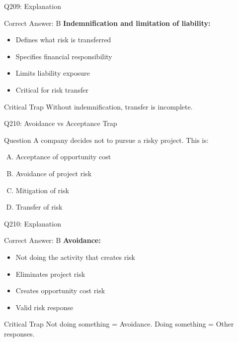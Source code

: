 \documentclass{beamer}
\begin{document}
	\begin{frame}{Q209: Explanation}
		\begin{block}{Correct Answer: B}
			\textbf{Indemnification and limitation of liability:}
			\begin{itemize}
				\item Defines what risk is transferred
				\item Specifies financial responsibility
				\item Limits liability exposure
				\item Critical for risk transfer
			\end{itemize}
		\end{block}
		\begin{alertblock}{Critical Trap}
			Without indemnification, transfer is incomplete.
		\end{alertblock}
	\end{frame}
	
	\begin{frame}{Q210: Avoidance vs Acceptance Trap}
		\begin{block}{Question}
			A company decides not to pursue a risky project. This is:
		\end{block}
		\begin{enumerate}[(A)]
			\item Acceptance of opportunity cost
			\item Avoidance of project risk
			\item Mitigation of risk
			\item Transfer of risk
		\end{enumerate}
	\end{frame}
	
	\begin{frame}{Q210: Explanation}
		\begin{block}{Correct Answer: B}
			\textbf{Avoidance:}
			\begin{itemize}
				\item Not doing the activity that creates risk
				\item Eliminates project risk
				\item Creates opportunity cost risk
				\item Valid risk response
			\end{itemize}
		\end{block}
		\begin{alertblock}{Critical Trap}
			Not doing something = Avoidance.
			Doing something = Other responses.
		\end{alertblock}
	\end{frame}
	
\end{document}
